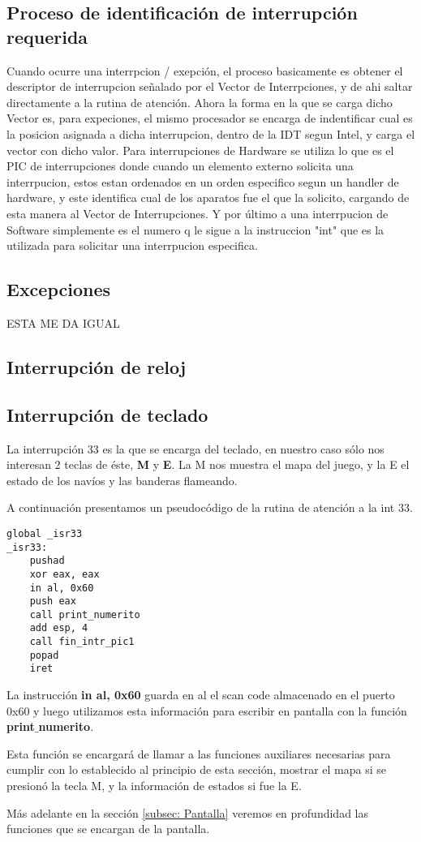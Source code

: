 \subsection{Proceso de identificación de interrupción requerida}
\par{Cuando ocurre una interrpcion / exepción, el proceso basicamente es obtener el descriptor de interrupcion señalado por el Vector de Interrpciones, y de ahi saltar directamente a la rutina de atención. Ahora la forma en la que se carga dicho Vector es, para expeciones, el mismo procesador se encarga de indentificar cual es la posicion asignada a dicha interrupcion, dentro de la IDT segun Intel, y carga el vector con dicho valor.  Para interrupciones de Hardware se utiliza lo que es el PIC de interrupciones donde cuando un elemento externo solicita una interrpucion, estos estan ordenados en un orden especifico segun un handler de hardware, y este identifica cual de los aparatos fue el que la solicito, cargando de esta manera al Vector de Interrupciones. Y por último a una interrpucion de Software simplemente es el numero q le sigue a la instruccion "int" que es la utilizada para solicitar una interrpucion especifica.}

\subsection{Excepciones}
\par{ESTA ME DA IGUAL}
\subsection{Interrupción de reloj}
\subsection{Interrupción de teclado}
\par{La interrupción 33 es la que se encarga del teclado, en nuestro caso sólo nos interesan 2 teclas de éste, \textbf{M} y \textbf{E}. La M nos muestra el mapa del juego, y la E el estado de los navíos y las banderas flameando.}
\par{A continuación presentamos un pseudocódigo de la rutina de atención a la int 33.}
\begin{lstlisting}[language={[x86masm]Assembler}]
global _isr33
_isr33:
    pushad
    xor eax, eax
    in al, 0x60
    push eax
    call print_numerito
    add esp, 4
    call fin_intr_pic1
    popad
    iret
\end{lstlisting}
\par{La instrucción \textbf{in al, 0x60} guarda en al el scan code almacenado en el puerto 0x60 y luego utilizamos esta información para escribir en pantalla con la función \textbf{print$\_$numerito}.}
\par{Esta función se encargará de llamar a las funciones auxiliares necesarias para cumplir con lo establecido al principio de esta sección, mostrar el mapa si se presionó la tecla M, y la información de estados si fue la E.}
\par{Más adelante en la sección \ref{subsec: Pantalla} veremos en profundidad las funciones que se encargan de la pantalla.}
